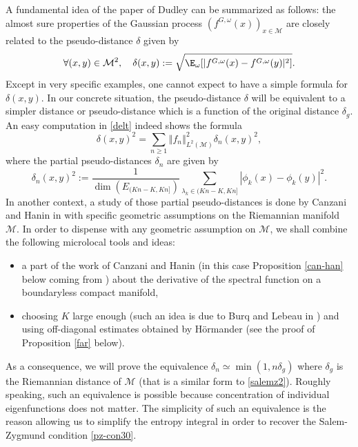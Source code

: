 A fundamental idea of the paper \cite{dudley1967} of Dudley can be summarized as follows: the almost sure properties of the Gaussian process $(f^{G,\omega}(x))_{x\in \mathcal{M}}$ are closely related to the pseudo-distance $\delta$ given by
\begin{equation}\label{delt}
\forall (x,y)\in \mathcal{M}^2, \quad \delta(x,y):=\sqrt{\E_{\omega}[|f^{G,\omega}(x)-f^{G,\omega}(y)|^2]}.
\end{equation}
Except in very specific examples, one cannot expect to have a simple formula for $\delta(x,y)$.
In our concrete situation, the pseudo-distance $\delta$ will be equivalent to a simpler distance or pseudo-distance which is a function of the original distance $\delta_g$.
An easy computation in \eqref{delt} indeed shows the formula
\begin{equation*}
\delta(x,y)^2=\sum_{n\geq 1} \left\Vert f_n \right\Vert_{L^2(\mathcal{M})}^2 \delta_n(x,y)^2,
\end{equation*}
where the partial pseudo-distances $\delta_n$ are given by
\begin{equation}\label{intro-dn}
\delta_n(x,y)^2:=\frac{1}{\dim(E_{(Kn-K,Kn]})} \sum_{\lambda_k \in (Kn-K,Kn]} |\phi_k(x)-\phi_k(y)|^2.
\end{equation}
In another context, a study of those partial pseudo-distances is done by Canzani and Hanin in \cite{canzani2017c} with specific geometric assumptions on the Riemannian manifold~$\mathcal{M}$.
In order to dispense with any geometric assumption on $\mathcal{M}$, we shall combine the following microlocal tools and ideas:
\begin{itemize}
\item a part of the work of Canzani and Hanin (in this case Proposition \ref{can-han} below coming from \cite[Lem.\,5]{canzani2015scaling}) about the derivative of the spectral function on a boundaryless compact manifold,
\item choosing $K$ large enough (such an idea is due to Burq and Lebeau in \cite{burq-lebeau}) and using off-diagonal estimates obtained by Hörmander (see the proof of Proposition \ref{far} below).
\end{itemize}
As a consequence, we will prove the equivalence $\delta_n\simeq \min(1,n\delta_g)$ where $\delta_g$ is the Riemannian distance of $\mathcal{M}$ (that is a similar form to \eqref{salemz2}). Roughly speaking, such an equivalence is possible because concentration of individual eigenfunctions does not matter. The simplicity of such an equivalence is the reason allowing us to simplify the entropy integral in order to recover the Salem-Zygmund condition \eqref{pz-con30}.
